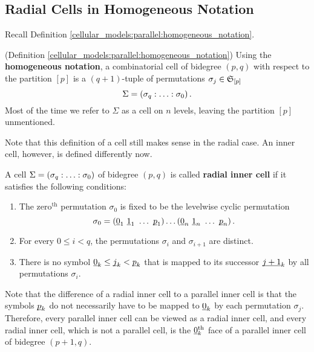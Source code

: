\subsection{Radial Cells in Homogeneous Notation}
\label{cellular_models:radial:cells_in_homogenous_notation}
Recall Definition \ref{cellular_models:parallel:homogeneous_notation}.

\begin{defi}(Definition \ref{cellular_models:parallel:homogeneous_notation})
\label{cellular_models:radial:homogeneous_notation}
Using the {\bf homogeneous notation}, a combinatorial cell of bidegree $(p,q)$ with respect to the partition $[p]$ is a $(q+1)$-tuple of permutations $\sigma_j \in \mathfrak S_{[p]}$
    \[
        \Sigma = \homogq \,.
    \]
    Most of the time we refer to $\Sigma$ as a cell on $n$ levels, leaving the partition $[p]$ unmentioned.
\end{defi}

Note that this definition of a cell still makes sense in the radial case.
An inner cell, however, is defined differently now.

\begin{defi}
\label{cellular_models:radial:inner_cells}
    A cell $\Sigma = \homogq$ of bidegree $(p,q)$ is called {\bf radial inner cell} if it satisfies the following conditions:
    \begin{enumerate}
        \item The zero${}^{\text{th}}$ permutation $\sigma_0$ is fixed to be the levelwise cyclic permutation 
              \[\sigma_0 = (\ul 0_1\ \ul 1_1\ \ldots\ \ul p_1)\ldots (\ul 0_n\ \ul 1_n\ \ldots\ \ul p_n)\,.\]
        \item For every $0 \le i < q$, the permutations $\sigma_i$ and $\sigma_{i+1}$ are distinct.
        \item There is no symbol $\underline{\smash{0}}_k \le \underline{\smash{j}}_k < \underline{\smash{p}}_k$ that is mapped to its successor $\underline{\smash{j+1}}_k$ by all permutations $\sigma_i$.
    \end{enumerate}
\end{defi}

Note that the difference of a radial inner cell to a parallel inner cell is 
that the symbols $\underline{\smash{p}}_k$ do not necessarily have to be mapped to $\underline{\smash{0}}_k$ by each permutation $\sigma_j$.
Therefore, every parallel inner cell can be viewed as a radial inner cell, 
and every radial inner cell, which is not a parallel cell, is the $\underline{\smash{0}}_k^{\text{th}}$ face of a parallel inner cell of bidegree $(p + 1, q)$.
 
